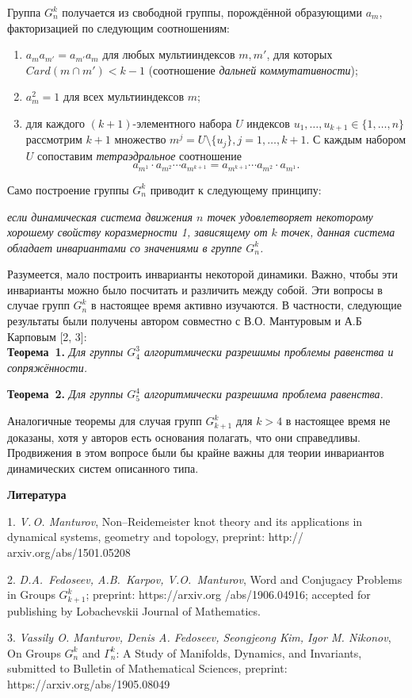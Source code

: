 Группа $G_n^k$ получается из свободной группы, порождённой образующими $a_m$, факторизацией по следующим соотношениям:

\begin{enumerate}
	\item $a_{m}a_{m'}=a_{m'}a_{m}$ для любых мультииндексов $m, m'$, для которых $Card(m\cap m') < k-1$ (соотношение {\em дальней коммутативности});
	\item $a_m^2=1$ для всех мультииндексов $m$;
	\item для каждого $(k+1)$-элементного набора $U$ индексов $u_{1},\dots, u_{k+1} \in \{1,\dots, n\}$ рассмотрим $k+1$ множество $m^{j}=U\setminus \{u_{j}\}, j=1,\dots, k+1$. С каждым набором $U$ сопоставим {\em тетраэдральное} соотношение $$a_{m^1}\cdot a_{m^2}\cdots a_{m^{k+1}}= a_{m^{k+1}}\cdots a_{m^2}\cdot a_{m^1}.$$
\end{enumerate}

Само построение группы $G_n^k$ приводит к следующему принципу:

\begin{center}
	{\em если динамическая система движения $n$ точек удовлетворяет некоторому хорошему свойству коразмерности 1, зависящему от $k$ точек, данная система обладает инвариантами со значениями в группе $G_n^k$.}
\end{center}

Разумеется, мало построить инварианты некоторой динамики. Важно, чтобы эти инварианты можно было посчитать и различить между собой. Эти вопросы в случае групп $G_n^k$ в настоящее время активно изучаются. В частности, следующие результаты были получены автором совместно с В.О. Мантуровым и А.Б Карповым [2, 3]: \\

\textbf{Теорема~1.} {\it Для группы $G_4^3$ алгоритмически разрешимы проблемы равенства и сопряжённости.}

\textbf{Теорема~2.} {\it Для группы $G_5^4$ алгоритмически разрешима проблема равенства.}

Аналогичные теоремы для случая групп $G_{k+1}^k$ для $k>4$ в настоящее время не доказаны, хотя у авторов есть основания полагать, что они справедливы. Продвижения в этом вопросе были бы крайне важны для теории инвариантов динамических систем описанного типа. 


\smallskip \centerline {\bf Литература} \nopagebreak


1. {\it V.\,O. Manturov}, Non--Reidemeister knot theory and its applications in dynamical systems, geometry and topology, preprint: http:// arxiv.org/abs/1501.05208

2. {\it D.A.~Fedoseev, A.B.~Karpov, V.O.~Manturov}, Word and Conjugacy Problems in Groups $G_{k+1}^{k}$; preprint: https://arxiv.org /abs/1906.04916; accepted for publishing by Lobachevskii Journal of Mathematics.

3. {\it Vassily O. Manturov, Denis A. Fedoseev, Seongjeong Kim, Igor M. Nikonov}, On Groups $G^k_n$ and $\Gamma^k_n$: A Study of Manifolds, Dynamics, and Invariants, submitted to Bulletin of Mathematical Sciences, preprint: https://arxiv.org/abs/1905.08049

